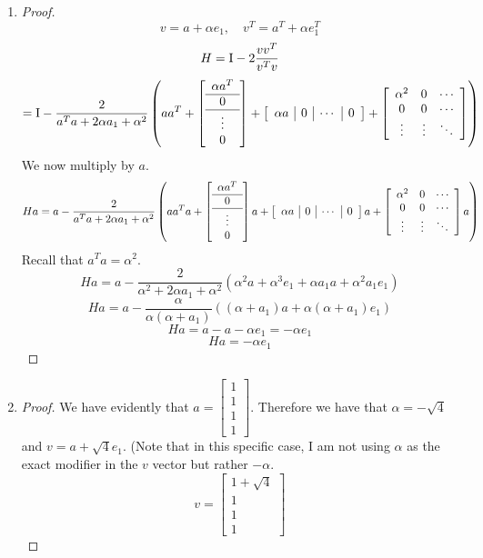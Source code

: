\documentclass{article}
\begin{document}
\begin{enumerate}
\begin{enumerate}
\item 
\begin{proof}
\[ 
    v = a + \alpha e_1, \quad v^T = a^T + \alpha e_1^T
\]
\[
    H = \mathrm{I} - 2\frac{vv^T}{v^Tv} 
\]
\[
= \mathrm{I} - \frac{2}{a^Ta + 2\alpha a_1 + \alpha^2}\left(aa^T + \left[\begin{array}{c}\alpha a^T\\ \hline 0 \\ \hline \vdots \\ 0\end{array}\right] + \left[\begin{array}{c | c | c | c} \alpha a & 0 & \cdots & 0\end{array}\right] + \left[\begin{array}{c c c} \alpha^2 & 0 & \cdots \\ 0  & 0 & \cdots\\ \vdots & \vdots & \ddots\end{array}\right]\right) 
\]
We now multiply by $a$. 
\[
    Ha = a - \frac{2}{a^Ta + 2\alpha a_1 + \alpha^2}\left(aa^Ta + \left[\begin{array}{c}\alpha a^T\\ \hline 0 \\ \hline \vdots \\ 0\end{array}\right]a + \left[\begin{array}{c | c | c | c} \alpha a & 0 & \cdots & 0\end{array}\right]a + \left[\begin{array}{c c c} \alpha^2 & 0 & \cdots \\ 0  & 0 & \cdots\\ \vdots & \vdots & \ddots\end{array}\right]a\right) 
\]
Recall that $a^Ta = \alpha^2$. 
\[
    Ha = a - \frac{2}{\alpha^2 + 2\alpha a_1 + \alpha^2}\left(\alpha^2a + \alpha^3 e_1 + \alpha a_1 a + \alpha^2 a_1 e_1\right) 
\]
\[
    Ha = a - \frac{\alpha}{\alpha(\alpha + a_1)}\left((\alpha + a_1)a + \alpha(\alpha + a_1) e_1\right)
\]
\[
    Ha = a - a - \alpha e_1 = -\alpha e_1
\]
\[
    Ha = -\alpha e_1
\]
\end{proof}

\item
\begin{proof}
    We have evidently that $a = \left[\begin{array}{c} 1 \\ 1\\ 1\\1\end{array}\right]$. Therefore we have that $\alpha = -\sqrt{4}$ and $v = a + \sqrt{4}e_1$. (Note that in this specific case, I am not using $\alpha$ as the exact modifier in the $v$ vector but rather $-\alpha$. 
\[
    v = \left[\begin{array}{c} 1 + \sqrt{4}\\1\\1\\1\end{array}\right]
\]
\end{proof}



\end{enumerate}
\end{enumerate}
\end{document}
